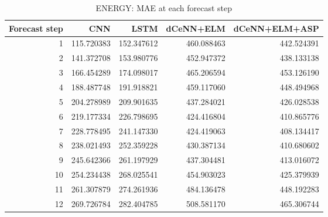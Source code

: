 \begin{table}
\caption{ENERGY: MAE at each forecast step}
\begin{tabular}{rrrrr}
\toprule
Forecast step & CNN & LSTM & dCeNN+ELM & dCeNN+ELM+ASP \\
\midrule
1 & 115.720383 & 152.347612 & 460.088463 & 442.524391 \\
2 & 141.372708 & 153.980776 & 452.947372 & 438.133138 \\
3 & 166.454289 & 174.098017 & 465.206594 & 453.126190 \\
4 & 188.487748 & 191.918821 & 459.117060 & 448.494968 \\
5 & 204.278989 & 209.901635 & 437.284021 & 426.028538 \\
6 & 219.177334 & 226.798695 & 424.416804 & 410.865776 \\
7 & 228.778495 & 241.147330 & 424.419063 & 408.134417 \\
8 & 238.021493 & 252.359228 & 430.387134 & 410.680602 \\
9 & 245.642366 & 261.197929 & 437.304481 & 413.016072 \\
10 & 254.234438 & 268.025541 & 454.903023 & 425.379939 \\
11 & 261.307879 & 274.261936 & 484.136478 & 448.192283 \\
12 & 269.726784 & 282.404785 & 508.581170 & 465.306744 \\
\bottomrule
\end{tabular}
\end{table}
